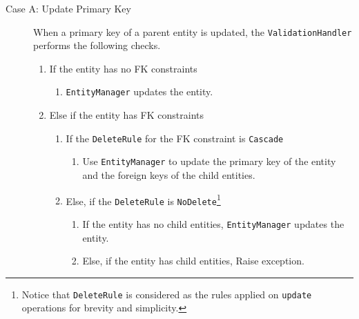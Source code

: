 \begin{description}
		\begin{description}
		\item[Case A: Update Primary Key] When a  primary key of a
		parent entity is updated,  the \texttt{ValidationHandler} performs the
		following checks. 
		\renewcommand{\labelenumii}{\arabic{enumi}. \arabic{enumii}}
		\renewcommand{\labelenumiii}{\arabic{enumi}. \arabic{enumii}. \arabic{enumiii}}
		\begin{enumerate}
		  \item If the entity has no \ac{FK} constraints 
		  	\begin{enumerate}
		  		  \item \texttt{EntityManager}  updates the entity. 
			\end{enumerate}		  	
		  \item Else if the entity has  \ac{FK} constraints  
		  		\begin{enumerate}		  	
				  \item If the \texttt{DeleteRule} for the \ac{FK} constraint is
				  \texttt{Cascade}
				    	\begin{enumerate}
				    	  \item Use \texttt{EntityManager} to
				    	   update the primary key of the entity and the foreign keys of the
				    	   child entities. 
						\end{enumerate}
				  \item Else,  if the \texttt{DeleteRule}  is
				  \texttt{NoDelete}\footnote{{Notice that \texttt{DeleteRule} is considered as the rules applied on
				  \texttt{update} operations for brevity and simplicity.}}
						\begin{enumerate}
						  \item If the entity has no child entities,  
						  		   \texttt{EntityManager}  updates the entity. 
						  \item Else,  if the entity has child entities,  
						    	  Raise exception.  
						\end{enumerate}
				\end{enumerate}
		 \end{enumerate}
		 

\end{description}
\end{description}
